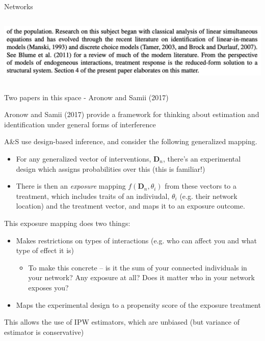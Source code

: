 \documentclass[notes,11pt, aspectratio=169]{beamer}
\newenvironment{wideitemize}{\itemize\addtolength{\itemsep}{10pt}}{\enditemize}
\begin{document}
\begin{frame}{Networks}
\begin{columns}[T]
\begin{column}{.5\textwidth}
\begin{center}
            \includegraphics[width=\linewidth]{images/manski7.png}\\
    \end{center}
  \end{column}
\end{columns}
\end{frame}


\begin{frame}{Two papers in this space - Aronow and Samii (2017)}
    \begin{wideitemize}
    \item Aronow and Samii (2017) provide a framework for thinking
      about estimation and identification under general forms of
      interference
    \item A\&S use design-based inference, and consider the following
      generalized mapping.
      \begin{itemize}
      \item For any generalized vector of interventions,
        $\mathbf{D}_{n}$, there's an experimental design which assigns
        probabilities over this (this is familiar!)
      \item There is then an \emph{exposure} mapping
        $f(\mathbf{D}_{n}, \theta_{i})$ from these vectors to a
        treatment, which includes traits of an indiviudal,
        $\theta_{i}$ (e.g. their network location) and the treatment
        vector, and maps it to an exposure outcome.
      \end{itemize}
    \item This exposure mapping does two things:
      \begin{itemize}
      \item Makes restrictions on types of interactions (e.g. who can affect you and what type of effect it is)
        \begin{itemize}
        \item To make this concrete -- is it the sum of your connected
          individuals in your network? Any exposure at all? Does it
          matter who in your network exposes you?
        \end{itemize}
      \item Maps the experimental design to a propensity score of the exposure treatment
      \end{itemize}
    \item This allows the use of IPW estimators, which are unbiased
      (but variance of estimator is conservative)
    \end{wideitemize}
\end{frame}
\end{document}
